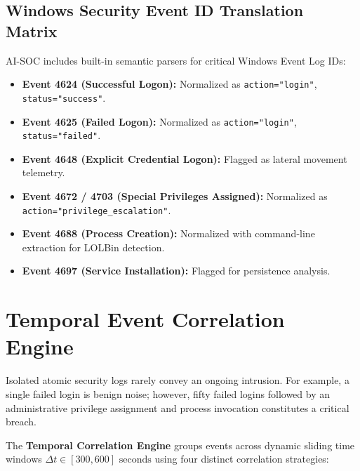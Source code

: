 \documentclass[11pt,a4paper]{article}
\begin{document}
\subsection{Windows Security Event ID Translation Matrix}
AI-SOC includes built-in semantic parsers for critical Windows Event Log IDs:
\begin{itemize}
    \item \textbf{Event 4624 (Successful Logon):} Normalized as \texttt{action="login"}, \texttt{status="success"}.
    \item \textbf{Event 4625 (Failed Logon):} Normalized as \texttt{action="login"}, \texttt{status="failed"}.
    \item \textbf{Event 4648 (Explicit Credential Logon):} Flagged as lateral movement telemetry.
    \item \textbf{Event 4672 / 4703 (Special Privileges Assigned):} Normalized as \texttt{action="privilege\_escalation"}.
    \item \textbf{Event 4688 (Process Creation):} Normalized with command-line extraction for LOLBin detection.
    \item \textbf{Event 4697 (Service Installation):} Flagged for persistence analysis.
\end{itemize}

\section{Temporal Event Correlation Engine}

Isolated atomic security logs rarely convey an ongoing intrusion. For example, a single failed login is benign noise; however, fifty failed logins followed by an administrative privilege assignment and process invocation constitutes a critical breach.

The \textbf{Temporal Correlation Engine} groups events across dynamic sliding time windows $\Delta t \in [300, 600]\text{ seconds}$ using four distinct correlation strategies:
\end{document}
